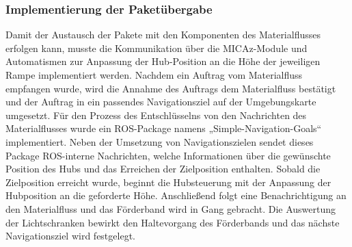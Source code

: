\subsubsection{Implementierung der Paketübergabe}
Damit der Austausch der Pakete mit den Komponenten des Materialflusses erfolgen kann, musste die Kommunikation über die MICAz-Module und Automatismen zur Anpassung der Hub-Position an die Höhe der jeweiligen Rampe implementiert werden. Nachdem ein Auftrag vom Materialfluss empfangen wurde, wird die Annahme des Auftrags dem Materialfluss bestätigt und der Auftrag  in ein passendes Navigationsziel auf der Umgebungskarte umgesetzt.  Für den Prozess des Entschlüsselns von den Nachrichten des Materialflusses wurde ein ROS-Package namens „Simple-Navigation-Goals“ implementiert. Neben der Umsetzung von Navigationszielen sendet dieses Package ROS-interne Nachrichten, welche Informationen über die gewünschte Position des Hubs und das Erreichen der Zielposition enthalten.
Sobald die Zielposition erreicht wurde, beginnt die Hubsteuerung mit der Anpassung der Hubposition an die geforderte Höhe. Anschließend folgt eine Benachrichtigung an den Materialfluss und das Förderband wird in Gang gebracht. Die Auswertung der Lichtschranken bewirkt den Haltevorgang des Förderbands und das nächste Navigationsziel wird festgelegt.